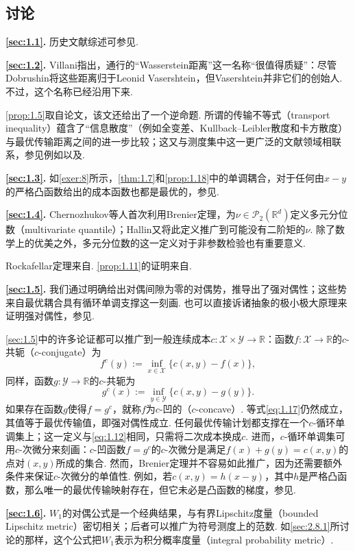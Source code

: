 \subsection{讨论}\label{sec:1.7}

\noindent\textbf{\autoref{sec:1.1}.} 历史文献综述可参见\cite{ref315}.

\noindent\textbf{\autoref{sec:1.2}.} Villani\cite{ref317}指出，通行的“Wasserstein距离”这一名称“很值得质疑”：尽管Dobrushin\cite{ref114}将这些距离归于Leonid Vasershtein，但Vasershtein并非它们的创始人. 不过，这个名称已经沿用下来.

\autoref{prop:1.5}取自论文\cite{ref271}，该文还给出了一个逆命题. 所谓的传输不等式（transport inequality）蕴含了“信息散度”（例如全变差、Kullback--Leibler散度和卡方散度）与最优传输距离之间的进一步比较；这又与测度集中这一更广泛的文献领域相联系，参见例如\cite{ref46}以及\cite[第22章]{ref317}.

\noindent\textbf{\autoref{sec:1.3}.} 如\autoref{exer:8}所示，\autoref{thm:1.7}和\autoref{prop:1.18}中的单调耦合，对于任何由$x-y$的严格凸函数给出的成本函数也都是最优的，参见\cite[第2.2节]{ref281}.

\noindent\textbf{\autoref{sec:1.4}.} Chernozhukov等人\cite{ref75}首次利用Brenier定理，为$\nu\in\mathcal P_2(\mathbb R^d)$定义多元分位数（multivariate quantile）；Hallin\cite{ref158}又将此定义推广到可能没有二阶矩的$\nu$. 除了数学上的优美之外，多元分位数的这一定义对于非参数检验也有重要意义\cite{ref103,ref147}.

Rockafellar定理来自\cite{ref273}. \autoref{prop:1.11}的证明来自\cite{ref138}.

\noindent\textbf{\autoref{sec:1.5}.} 我们通过明确给出对偶间隙为零的对偶势，推导出了强对偶性；这些势来自最优耦合具有循环单调支撑这一刻画. 也可以直接诉诸抽象的极小极大原理来证明强对偶性，参见\cite[第1.1节]{ref315}.

\autoref{sec:1.5}中的许多论证都可以推广到一般连续成本$c:\mathcal X\times\mathcal Y\to\mathbb R$：函数$f:\mathcal X\to\mathbb R$的$c$-共轭（$c$-conjugate）为
$$
f^c(y):=\inf_{x\in\mathcal X}\{c(x,y)-f(x)\},
$$
同样，函数$g:\mathcal Y\to\mathbb R$的$c$-共轭为
$$
g^c(x):=\inf_{y\in\mathcal Y}\{c(x,y)-g(y)\}.
$$
如果存在函数$g$使得$f=g^c$，就称$f$为$c$-凹的（$c$-concave）. 等式\eqref{eq:1.17}仍然成立，其值等于最优传输值，即强对偶性成立. 任何最优传输计划都支撑在一个$c$-循环单调集上；这一定义与\eqref{eq:1.12}相同，只需将二次成本换成$c$. 进而，$c$-循环单调集可用$c$-次微分来刻画：$c$-凹函数$f=g^c$的$c$-次微分是满足$f(x)+g(y)=c(x,y)$的点对$(x,y)$所成的集合. 然而，Brenier定理并不容易如此推广，因为还需要额外条件来保证$c$-次微分的单值性. 例如，若$c(x,y)=h(x-y)$，其中$h$是严格凸函数，那么唯一的最优传输映射存在，但它未必是凸函数的梯度，参见\cite[定理1.17]{ref281}.

\noindent\textbf{\autoref{sec:1.6}.} $W_1$的对偶公式是一个经典结果，与有界Lipschitz度量（bounded Lipschitz metric）\cite{ref123}密切相关；后者可以推广为符号测度上的范数. 如\autoref{sec:2.8.1}所讨论的那样，这个公式把$W_1$表示为积分概率度量（integral probability metric）.
